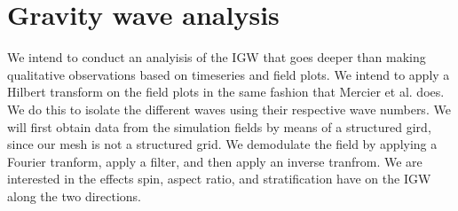 \section{Gravity wave analysis}
\label{section:IGW_analysis}
We intend to conduct an analyisis of the IGW that goes deeper than making qualitative observations based on timeseries and field plots. We intend to apply a Hilbert transform on the field plots in the same fashion that Mercier et al. \cite{mercier_reflection_2008} does. We do this to isolate the different waves using their respective wave numbers. We will first obtain data from the simulation fields by means of a structured gird, since our mesh is not a structured grid. We demodulate the field by applying a Fourier tranform, apply a filter, and then apply an inverse tranfrom. We are interested in the effects spin, aspect ratio, and stratification have on the IGW along the two directions. 